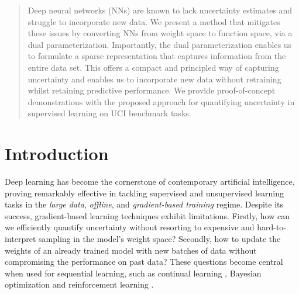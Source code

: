 \documentclass{article}
\begin{document}
\begin{abstract}
Deep neural networks (NNs) are known to lack uncertainty estimates and struggle to incorporate new data. We present a method that mitigates these issues by converting NNs from weight space to function space, via a dual parameterization. Importantly, the dual parameterization enables us to formulate a sparse representation that captures information from the entire data set. This offers a compact and principled way of capturing uncertainty and enables us to incorporate new data without retraining whilst retaining predictive performance. We provide proof-of-concept demonstrations with the proposed approach for quantifying uncertainty in supervised learning on UCI benchmark tasks.
\end{abstract}

\section{Introduction}
%
Deep learning \citep{goodfellow2016deep} has become the cornerstone of contemporary artificial intelligence, proving remarkably effective in tackling supervised and unsupervised learning tasks in the {\em large data}, {\em offline}, and {\em gradient-based training} regime. Despite its success, gradient-based learning techniques exhibit limitations. Firstly, how can we efficiently quantify uncertainty without resorting to expensive and hard-to-interpret sampling in the model's weight space? Secondly, how to update the weights of an already trained model with new batches of data without compromising the performance on past data?
These questions become central when used for sequential learning,
such as continual learning \citep[CL,][]{parisi2019continual, de2021continual}, Bayesian optimization \citep[BO,][]{garnett_bayesoptbook_2022} and reinforcement learning  \citep[RL,][]{sutton2018reinforcement}.
\end{document}
